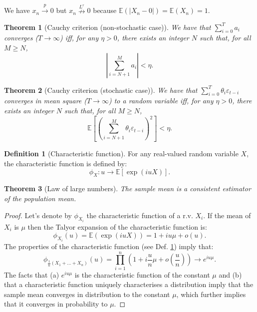 \documentclass[
]{book}
\newtheorem{theorem}{Theorem}[chapter]
\theoremstyle{definition}
\newtheorem{definition}{Definition}[chapter]
\theoremstyle{definition}
\theoremstyle{definition}
\theoremstyle{definition}
\theoremstyle{remark}
\begin{document}
We have \(x_n \overset{p}{\rightarrow} 0\) but \(x_n \overset{L^r}{\nrightarrow} 0\) because \(\mathbb{E}(|X_n-0|)=\mathbb{E}(X_n)=1\).

\begin{theorem}[Cauchy criterion (non-stochastic case)]
\protect\hypertarget{thm:cauchycritstatic}{}\label{thm:cauchycritstatic}We have that \(\sum_{i=0}^{T} a_i\) converges (\(T \rightarrow \infty\)) iff, for any \(\eta > 0\), there exists an integer \(N\) such that, for all \(M\ge N\),
\[
\left|\sum_{i=N+1}^{M} a_i\right| < \eta.
\]
\end{theorem}

\begin{theorem}[Cauchy criterion (stochastic case)]
\protect\hypertarget{thm:cauchycritstochastic}{}\label{thm:cauchycritstochastic}We have that \(\sum_{i=0}^{T} \theta_i \varepsilon_{t-i}\) converges in mean square (\(T \rightarrow \infty\)) to a random variable iff, for any \(\eta > 0\), there exists an integer \(N\) such that, for all \(M\ge N\),
\[
\mathbb{E}\left[\left(\sum_{i=N+1}^{M} \theta_i \varepsilon_{t-i}\right)^2\right] < \eta.
\]
\end{theorem}

\begin{definition}[Characteristic function]
\protect\hypertarget{def:characteristic}{}\label{def:characteristic}For any real-valued random variable \(X\), the characteristic function is defined by:
\[
\phi_X: u \rightarrow \mathbb{E}[\exp(iuX)].
\]
\end{definition}

\begin{theorem}[Law of large numbers]
\protect\hypertarget{thm:LLNappendix}{}\label{thm:LLNappendix}The sample mean is a consistent estimator of the population mean.
\end{theorem}

\begin{proof}
Let's denote by \(\phi_{X_i}\) the characteristic function of a r.v. \(X_i\). If the mean of \(X_i\) is \(\mu\) then the Talyor expansion of the characteristic function is:
\[
\phi_{X_i}(u) = \mathbb{E}(\exp(iuX)) = 1 + iu\mu + o(u).
\]
The properties of the characteristic function (see Def. \ref{def:characteristic}) imply that:
\[
\phi_{\frac{1}{n}(X_1+\dots+X_n)}(u) = \prod_{i=1}^{n} \left(1 + i\frac{u}{n}\mu + o\left(\frac{u}{n}\right) \right) \rightarrow e^{iu\mu}.
\]
The facts that (a) \(e^{iu\mu}\) is the characteristic function of the constant \(\mu\) and (b) that a characteristic function uniquely characterises a distribution imply that the sample mean converges in distribution to the constant \(\mu\), which further implies that it converges in probability to \(\mu\).
\end{proof}
\end{document}

